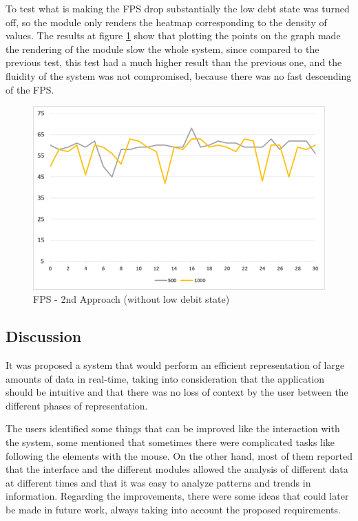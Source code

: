 \documentclass[letterpaper, 10 pt, conference]{ieeeconf}  %
\begin{document}
To test what is making the FPS drop substantially the low debt state was turned off, so the module only renders the heatmap corresponding to the density of values. The results at figure \ref{fig:fps3} show that plotting the points on the graph made the rendering of the module slow the whole system, since compared to the previous test, this test had a much higher result than the previous one, and the fluidity of the system was not compromised, because there was no fast descending of the FPS.

\begin{figure}[!ht]
    \centering
    \includegraphics[width=\linewidth]{Figures/fps3.png}
    \caption{FPS - 2nd Approach (without low debit state)}
        \label{fig:fps3}
\end{figure}

\subsection{Discussion}
\label{subsection:discussion}
It was proposed a system that would perform an efficient representation of large amounts of data in real-time, taking into consideration that the application should be intuitive and that there was no loss of context by the user between the different phases of representation.

The users identified some things that can be improved like the interaction with the system, some mentioned that sometimes there were complicated tasks like following the elements with the mouse. On the other hand, most of them reported that the interface and the different modules allowed the analysis of different data at different times and that it was easy to analyze patterns and trends in information. Regarding the improvements, there were some ideas that could later be made in future work, always taking into account the proposed requirements.
\end{document}
